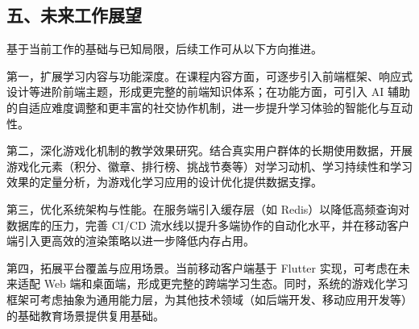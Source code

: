 \begin{conclusion}
\section*{五、未来工作展望}

基于当前工作的基础与已知局限，后续工作可从以下方向推进。

第一，扩展学习内容与功能深度。在课程内容方面，可逐步引入前端框架、响应式设计等进阶前端主题，形成更完整的前端知识体系；在功能方面，可引入 AI 辅助的自适应难度调整和更丰富的社交协作机制，进一步提升学习体验的智能化与互动性。

第二，深化游戏化机制的教学效果研究。结合真实用户群体的长期使用数据，开展游戏化元素（积分、徽章、排行榜、挑战节奏等）对学习动机、学习持续性和学习效果的定量分析，为游戏化学习应用的设计优化提供数据支撑。

第三，优化系统架构与性能。在服务端引入缓存层（如 Redis）以降低高频查询对数据库的压力，完善 CI/CD 流水线以提升多端协作的自动化水平，并在移动客户端引入更高效的渲染策略以进一步降低内存占用。

第四，拓展平台覆盖与应用场景。当前移动客户端基于 Flutter 实现，可考虑在未来适配 Web 端和桌面端，形成更完整的跨端学习生态。同时，系统的游戏化学习框架可考虑抽象为通用能力层，为其他技术领域（如后端开发、移动应用开发等）的基础教育场景提供复用基础。
\end{conclusion}
